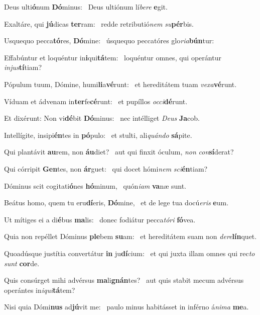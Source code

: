 \item Deus ulti\textbf{ó}num \textbf{Dó}minus:~\psstar{} Deus ultiónum lí\textit{bere} \textbf{e}git.
\item Exaltáre, qui \textbf{jú}dicas \textbf{ter}ram:~\psstar{} redde retributió\textit{nem} \textit{su}\textbf{pér}bis.
\item Usquequo pecca\textbf{tó}res, \textbf{Dó}mine:~\psstar{} úsquequo peccatóres glo\textit{ria}\textbf{bún}tur:
\item Effabúntur et loquéntur in\textbf{i}qui\textbf{tá}tem:~\psstar{} loquéntur omnes, qui operántur \textit{injus}\textbf{tí}tiam?
\item Pópulum tuum, Dómine, humi\textbf{li}a\textbf{vé}runt:~\psstar{} et hereditátem tuam \textit{vexa}\textbf{vé}runt.
\item Víduam et ádvenam in\textbf{ter}fe\-\textbf{cé}runt:~\psstar{} et pupíllos \textit{occi}\textbf{dé}runt.
\item Et dixérunt: Non vi\textbf{dé}bit \textbf{Dó}minus:~\psstar{} nec intélliget \textit{Deus} \textbf{Ja}cob.
\item Intellígite, insipi\textbf{én}tes in \textbf{pó}pulo:~\psstar{} et stulti, ali\textit{quándo} \textbf{sá}pite.
\item Qui plantávit \textbf{au}rem, non \textbf{áu}diet?~\psstar{} aut qui finxit óculum, \textit{non} \textit{con}\textbf{sí}derat?
\item Qui córripit \textbf{Gen}tes, non \textbf{ár}guet:~\psstar{} qui docet hómi\textit{nem} \textit{sci}\textbf{én}tiam?
\item Dóminus scit cogitati\textbf{ó}nes \textbf{hó}minum,~\psstar{} quón\textit{iam} \textbf{va}næ sunt.
\item Beátus homo, quem tu eru\textbf{dí}eris, \textbf{Dó}mine,~\psstar{} et de lege tua docú\textit{eris} \textbf{e}um.
\item Ut mítiges ei a di\textbf{é}bus \textbf{ma}lis:~\psstar{} donec fodiátur pecca\textit{tóri} \textbf{fó}vea.
\item Quia non repéllet Dóminus \textbf{ple}bem \textbf{su}am:~\psstar{} et hereditátem suam non \textit{dere}\textbf{lín}quet.
\item Quoadúsque justítia convertátur \textbf{in} ju\textbf{dí}cium:~\psstar{} et qui juxta illam omnes qui rec\textit{to} \textit{sunt} \textbf{cor}de.
\item Quis consúrget mihi advérsus \textbf{ma}li\textbf{gnán}tes?~\psstar{} aut quis stabit mecum advérsus operántes in\textit{iqui}\textbf{tá}tem?
\item Nisi quia Dómi\textbf{nus} ad\textbf{jú}vit me:~\psstar{} paulo minus habitásset in inférno á\textit{nima} \textbf{me}a.
